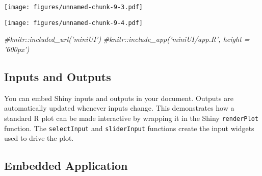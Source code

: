 \documentclass[
  french,
]{article}
\newenvironment{Shaded}{\begin{snugshade}}{\end{snugshade}}
\newcommand{\CommentTok}[1]{\textcolor[rgb]{0.56,0.35,0.01}{\textit{#1}}}
\newcommand{\DataTypeTok}[1]{\textcolor[rgb]{0.13,0.29,0.53}{#1}}
\newcommand{\DecValTok}[1]{\textcolor[rgb]{0.00,0.00,0.81}{#1}}
\newcommand{\KeywordTok}[1]{\textcolor[rgb]{0.13,0.29,0.53}{\textbf{#1}}}
\newcommand{\NormalTok}[1]{#1}
\newcommand{\OperatorTok}[1]{\textcolor[rgb]{0.81,0.36,0.00}{\textbf{#1}}}
\newcommand{\OtherTok}[1]{\textcolor[rgb]{0.56,0.35,0.01}{#1}}
\newcommand{\StringTok}[1]{\textcolor[rgb]{0.31,0.60,0.02}{#1}}
\begin{document}
\texttt{[image: figures/unnamed-chunk-9-3.pdf]}

\begin{Shaded}
\end{Shaded}

\texttt{[image: figures/unnamed-chunk-9-4.pdf]}

\begin{Shaded}
\begin{Highlighting}[]
\CommentTok{#knitr::included_url('miniUI')}
\CommentTok{#knitr::include_app('miniUI/app.R', height = '600px')}
\end{Highlighting}
\end{Shaded}

\hypertarget{inputs-and-outputs}{%
\subsection{Inputs and Outputs}\label{inputs-and-outputs}}

You can embed Shiny inputs and outputs in your document. Outputs are automatically updated whenever inputs change. This demonstrates how a standard R plot can be made interactive by wrapping it in the Shiny \texttt{renderPlot} function. The \texttt{selectInput} and \texttt{sliderInput} functions create the input widgets used to drive the plot.

\hypertarget{embedded-application}{%
\subsection{Embedded Application}\label{embedded-application}}
\end{document}
